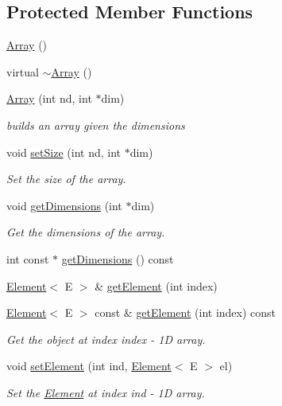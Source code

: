 \subsection*{Protected Member Functions}
\begin{DoxyCompactItemize}
\item 
\mbox{\hyperlink{classbridges_1_1datastructure_1_1_array_a23cb659c4f39e5e6f3b29a58e97b8e0d}{Array}} ()
\item 
virtual \mbox{\hyperlink{classbridges_1_1datastructure_1_1_array_a5a9f212f560e9673259eece27d8f11cc}{$\sim$\+Array}} ()
\item 
\mbox{\hyperlink{classbridges_1_1datastructure_1_1_array_ac107ce41bbb435dfe6b92129c47bf58e}{Array}} (int nd, int $\ast$dim)
\begin{DoxyCompactList}\small\item\em builds an array given the dimensions \end{DoxyCompactList}\item 
void \mbox{\hyperlink{classbridges_1_1datastructure_1_1_array_a2bfb10e98b1745a7ca173459626352a9}{set\+Size}} (int nd, int $\ast$dim)
\begin{DoxyCompactList}\small\item\em Set the size of the array. \end{DoxyCompactList}\item 
void \mbox{\hyperlink{classbridges_1_1datastructure_1_1_array_aa2a14939c8e53087e833ebf71822a057}{get\+Dimensions}} (int $\ast$dim)
\begin{DoxyCompactList}\small\item\em Get the dimensions of the array. \end{DoxyCompactList}\item 
int const  $\ast$ \mbox{\hyperlink{classbridges_1_1datastructure_1_1_array_a6d9edc546fa172a47f19de3c2ea93ebf}{get\+Dimensions}} () const
\item 
\mbox{\hyperlink{classbridges_1_1datastructure_1_1_element}{Element}}$<$ E $>$ \& \mbox{\hyperlink{classbridges_1_1datastructure_1_1_array_aaf44dbc671651d6e1383d1c523348f28}{get\+Element}} (int index)
\item 
\mbox{\hyperlink{classbridges_1_1datastructure_1_1_element}{Element}}$<$ E $>$ const  \& \mbox{\hyperlink{classbridges_1_1datastructure_1_1_array_ad2704d36d824ef7356fda5f6d7974ba7}{get\+Element}} (int index) const
\begin{DoxyCompactList}\small\item\em Get the object at index index -\/ 1D array. \end{DoxyCompactList}\item 
void \mbox{\hyperlink{classbridges_1_1datastructure_1_1_array_a120174198dc4de388af154d97951e856}{set\+Element}} (int ind, \mbox{\hyperlink{classbridges_1_1datastructure_1_1_element}{Element}}$<$ E $>$ el)
\begin{DoxyCompactList}\small\item\em Set the \mbox{\hyperlink{classbridges_1_1datastructure_1_1_element}{Element}} at index ind -\/ 1D array. \end{DoxyCompactList}\end{DoxyCompactItemize}
